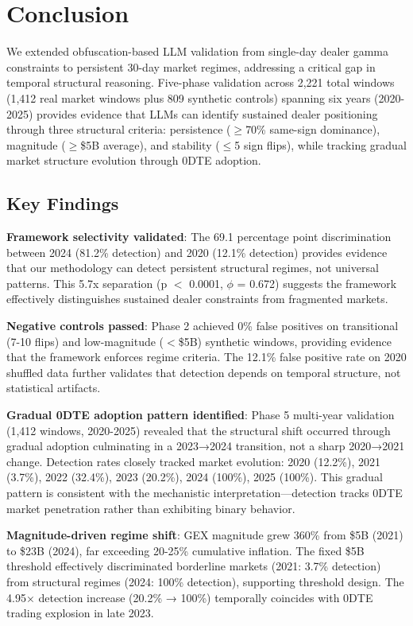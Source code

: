 \section{Conclusion}

We extended obfuscation-based LLM validation from single-day dealer gamma constraints to persistent 30-day market regimes, addressing a critical gap in temporal structural reasoning. Five-phase validation across 2,221 total windows (1,412 real market windows plus 809 synthetic controls) spanning six years (2020-2025) provides evidence that LLMs can identify sustained dealer positioning through three structural criteria: persistence ($\geq$70\% same-sign dominance), magnitude ($\geq$\$5B average), and stability ($\leq$5 sign flips), while tracking gradual market structure evolution through 0DTE adoption.

\subsection{Key Findings}

\textbf{Framework selectivity validated}: The 69.1 percentage point discrimination between 2024 (81.2\% detection) and 2020 (12.1\% detection) provides evidence that our methodology can detect persistent structural regimes, not universal patterns. This 5.7x separation (p $<$ 0.0001, $\phi$ = 0.672) suggests the framework effectively distinguishes sustained dealer constraints from fragmented markets.

\textbf{Negative controls passed}: Phase 2 achieved 0\% false positives on transitional (7-10 flips) and low-magnitude ($<$\$5B) synthetic windows, providing evidence that the framework enforces regime criteria. The 12.1\% false positive rate on 2020 shuffled data further validates that detection depends on temporal structure, not statistical artifacts.

\textbf{Gradual 0DTE adoption pattern identified}: Phase 5 multi-year validation (1,412 windows, 2020-2025) revealed that the structural shift occurred through gradual adoption culminating in a 2023→2024 transition, not a sharp 2020→2021 change. Detection rates closely tracked market evolution: 2020 (12.2\%), 2021 (3.7\%), 2022 (32.4\%), 2023 (20.2\%), 2024 (100\%), 2025 (100\%). This gradual pattern is consistent with the mechanistic interpretation—detection tracks 0DTE market penetration rather than exhibiting binary behavior.

\textbf{Magnitude-driven regime shift}: GEX magnitude grew 360\% from \$5B (2021) to \$23B (2024), far exceeding 20-25\% cumulative inflation. The fixed \$5B threshold effectively discriminated borderline markets (2021: 3.7\% detection) from structural regimes (2024: 100\% detection), supporting threshold design. The 4.95× detection increase (20.2\% → 100\%) temporally coincides with 0DTE trading explosion in late 2023.

